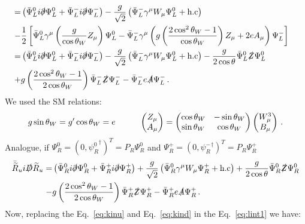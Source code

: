 \begin{align}
\nonumber\\
=&\left(\bar{\Psi}_L^0i\slashed{\partial}\Psi_L^0+\bar{\Psi}_L^-i\slashed{\partial}\Psi_L^-\right)
-\dfrac{g}{\sqrt{2}}\left(\bar{\Psi}_L^-\gamma^{\mu}W_{\mu}\Psi_L^0
+\text{h.c}\right)\nonumber\\
-&\dfrac{1}{2}\left[\bar{\Psi}_L^0\gamma^{\mu}\left(\dfrac{g}{\cos\theta_W}Z_{\mu}\right)\Psi_L^0-\bar{\Psi}_L^-\gamma^{\mu}\left(g\left(\dfrac{2\cos^2\theta_W-1}{\cos\theta_W}\right)Z_{\mu}+2eA_{\mu}\right)\Psi_L^-\right]
\nonumber\\
=&\left(\bar{\Psi}_L^0i\slashed{\partial}\Psi_L^0+\bar{\Psi}_L^-i\slashed{\partial}\Psi_L^-\right)
-\dfrac{g}{\sqrt{2}}\left(\bar{\Psi}_L^-\gamma^{\mu}W_{\mu}\Psi_L^0
+\text{h.c}\right)
-\dfrac{g}{2\cos\theta}\bar{\Psi}_L^0\slashed{Z}\Psi_L^0 \nonumber\\
+& g\left(\dfrac{2\cos^2\theta_W-1}{2\cos\theta_W}\right)\bar{\Psi}_L^-\slashed{Z}\Psi_L^--\bar{\Psi}_L^-e\slashed{A}\Psi_L^-\,.
\end{align}
We used the SM relations:
\begin{align}
g\sin\theta_W=g'\cos\theta_W=e \hspace{1.0 cm} \begin{pmatrix}
Z_{\mu} \\ A_{\mu}
\end{pmatrix}=\begin{pmatrix}
\cos\theta_W & -\sin\theta_W \\
\sin\theta_W & \cos\theta_W
\end{pmatrix}\begin{pmatrix}
W^3_{\mu} \\ B_{\mu}
\end{pmatrix}\,.
\end{align}
Analogue, if  $\Psi_{R}^0=(0,{\psi_R^0}^{\dagger})^{T}=P_{R}\Psi_R^0$ and 
$\Psi_{R}^+=(0,{\psi_R^-}^{\dagger})^{T}=P_{R}\Psi_R^+$
\begin{align}
\label{eq:kind}
\bar{\widetilde{R}}_ui\slashed{D}\widetilde{R}_u 
=&\left(\bar{{\Psi}}_R^0i\slashed{\partial}\Psi_R^0+\bar{\Psi}_R^+i\slashed{\partial}\Psi_R^+\right)
+\dfrac{g}{\sqrt{2}}\left(\bar{\Psi}_R^0\gamma^{\mu}W_{\mu}\Psi_R^+
+\text{h.c}\right)
+\dfrac{g}{2\cos\theta}\bar{\Psi}_R^0\slashed{Z}\Psi_R^0 \nonumber\\
-& g\left(\dfrac{2\cos^2\theta_W-1}{2\cos\theta_W}\right)\bar{\Psi}_R^+\slashed{Z}\Psi_R^+-\bar{\Psi}_R^+e\slashed{A}\Psi_R^+\,.
\end{align}
%
Now, replacing the Eq.~\eqref{eq:kinu} and Eq.~\eqref{eq:kind} in the Eq.~\eqref{eq:lint1} we have: 
